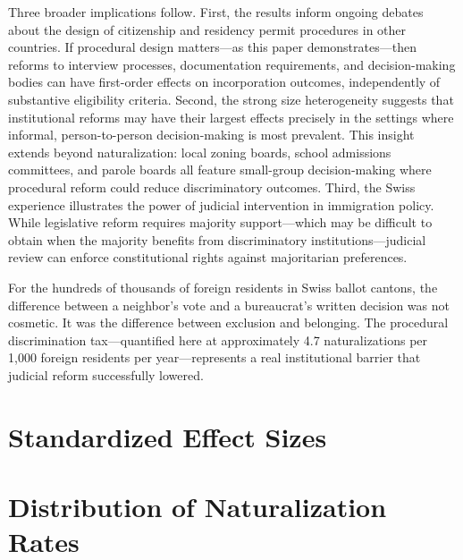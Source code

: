 \documentclass[12pt]{article}
\begin{document}
Three broader implications follow. First, the results inform ongoing debates about the design of citizenship and residency permit procedures in other countries. If procedural design matters---as this paper demonstrates---then reforms to interview processes, documentation requirements, and decision-making bodies can have first-order effects on incorporation outcomes, independently of substantive eligibility criteria. Second, the strong size heterogeneity suggests that institutional reforms may have their largest effects precisely in the settings where informal, person-to-person decision-making is most prevalent. This insight extends beyond naturalization: local zoning boards, school admissions committees, and parole boards all feature small-group decision-making where procedural reform could reduce discriminatory outcomes. Third, the Swiss experience illustrates the power of judicial intervention in immigration policy. While legislative reform requires majority support---which may be difficult to obtain when the majority benefits from discriminatory institutions---judicial review can enforce constitutional rights against majoritarian preferences.

For the hundreds of thousands of foreign residents in Swiss ballot cantons, the difference between a neighbor's vote and a bureaucrat's written decision was not cosmetic. It was the difference between exclusion and belonging. The procedural discrimination tax---quantified here at approximately 4.7 naturalizations per 1,000 foreign residents per year---represents a real institutional barrier that judicial reform successfully lowered.

\label{apep_main_text_end}






\clearpage
\appendix
\section{Standardized Effect Sizes}\label{app:sde}



\clearpage
\section{Distribution of Naturalization Rates}\label{app:distribution}
\end{document}
